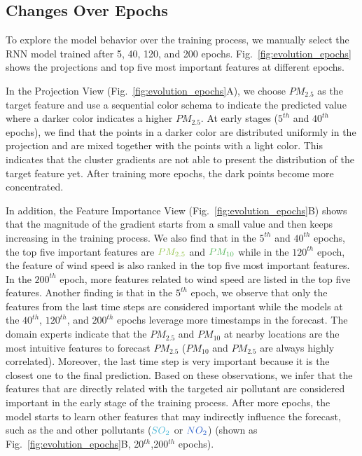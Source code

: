 \subsection{Changes Over Epochs}
To explore the model behavior over the training process, we manually select the RNN model trained after 5, 40, 120, and 200 epochs. Fig.~\ref{fig:evolution_epochs} shows the projections and top five most important features at different epochs.

In the Projection View (Fig.~\ref{fig:evolution_epochs}A), we choose $PM_{2.5}$ as the target feature and use a sequential color schema to indicate the predicted value where a darker color indicates a higher $PM_{2.5}$. 
At early stages ($5^{th}$ and $40^{th}$ epochs), we find that the points in a darker color are distributed uniformly in the projection and are mixed together with the points with a light color. 
This indicates that the cluster gradients are not able to present the distribution of the target feature yet.
After training more epochs, the dark points become more concentrated. 

In addition, the Feature Importance View (Fig.~\ref{fig:evolution_epochs}B) shows that the magnitude of the gradient starts from a small value and then keeps increasing in the training process. 
We also find that in the $5^{th}$ and $40^{th}$ epochs, the top five important features are $\color{PM25Color}{PM_{2.5}}$ and $\color{PM10Color}{PM_{10}}$ while in the $120^{th}$ epoch, the feature of wind speed is also ranked in the top five most important features. 
In the $200^{th}$ epoch, more features related to wind speed are listed in the top five features.
Another finding is that in the $5^{th}$ epoch, we observe that only the features from the last time steps are considered important while the models at the $40^{th}$, $120^{th}$, and $200^{th}$ epochs leverage more timestamps in the forecast.  
The domain experts indicate that the $PM_{2.5}$ and $PM_{10}$ at nearby locations are the most intuitive features to forecast $PM_{2.5}$ ($PM_{10}$ and $PM_{2.5}$ are always highly correlated).
Moreover, the last time step is very important because it is the closest one to the final prediction. 
Based on these observations, we infer that the features that are directly related with the targeted air pollutant are considered important in the early stage of the training process.
After more epochs, the model starts to learn other features that may indirectly influence the forecast, such as the \textit{\color{WINDColor}{Wind Speed}} and other pollutants ($\color{SO2Color}{SO_2}$ or $\color{NO2Color}{NO_2}$) (shown as Fig.~\ref{fig:evolution_epochs}B, 20$^{th}$,200$^{th}$ epochs). 

